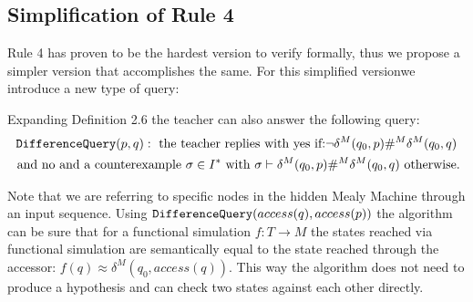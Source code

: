 \subsection{Simplification of Rule 4}
Rule 4 has proven to be the hardest version to verify formally, thus we propose a simpler version that accomplishes the same. For this simplified versionwe introduce a new type of query: 
\begin{definition}
	Expanding Definition 2.6 the teacher can also answer the following query:
	\begin{gather*}
		\textnormal{\texttt{DifferenceQuery}}(p,q): \text{ the teacher replies with yes if:} \neg\delta^M(q_0,p)\#^M\delta^M(q_0,q)\\ \text{ and no and a counterexample } \sigma\in I^* \text{ with } \sigma\vdash\delta^M(q_0,p)\#^M\delta^M(q_0,q) \text{ otherwise.}
	\end{gather*}
\end{definition}
Note that we are referring to specific nodes in the hidden Mealy Machine through an input sequence. Using $\textnormal{\texttt{DifferenceQuery}} (access(q),access(p))$ the algorithm can be sure that for a functional simulation $f:T\rightarrow M$ the states reached via functional simulation are semantically equal to the state reached through the accessor: $f(q)\approx \delta^M(q_0,access(q))$. This way the algorithm does not need to produce a hypothesis and can check two states against each other directly. \\
